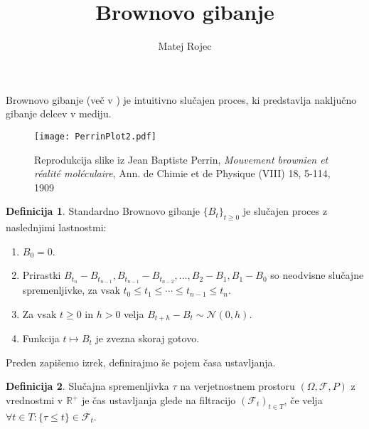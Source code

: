 \documentclass[11pt]{article}
\newcommand{\f}{\mathcal{F}}
\theoremstyle{definition}
\newtheorem{definicija}{Definicija}
\theoremstyle{plain}
\begin{document}
\title{Brownovo gibanje}
\author{Matej Rojec}
\date{}

\maketitle


Brownovo gibanje (več v \cite{karatzas1991brownian}) je intuitivno slučajen proces, %
ki predstavlja naključno gibanje delcev v mediju.
    
\begin{figure}[!ht]
    \texttt{[image: PerrinPlot2.pdf]}
    \centering
    \caption{Reprodukcija slike iz Jean Baptiste Perrin, \emph{Mouvement brownien et réalité moléculaire}, Ann. de Chimie et de Physique (VIII) 18, 5-114, 1909}
\end{figure}

\begin{definicija}
        Standardno Brownovo gibanje $\{B_t\}_{t \geq 0}$ je slučajen proces z naslednjimi lastnostmi: 

\begin{enumerate}
               \item $B_0 = 0$.
               \item Prirastki $B_{t_n} - B_{t_{n-1}}, B_{t_{n-1}} - B_{t_{n-2}}, \ldots, B_2 - B_1, B_1 - B_0$ so neodvisne slučajne spremenljivke, za vsak $t_0 \leq t_1 \leq \cdots \leq t_{n-1} \leq t_n$.
                \item Za vsak $t \geq 0$ in $h > 0$ velja $B_{t+h} - B_t \sim \mathcal{N}(0, h)$.
                \item Funkcija $t \mapsto B_t$ je zvezna skoraj gotovo.
\end{enumerate}
\end{definicija}
    
    Preden zapišemo izrek, definirajmo še pojem časa ustavljanja.
    

\begin{definicija}
        Slučajna spremenljivka $\tau$ na verjetnostnem prostoru $(\Omega,\f,P)$ z vrednostmi v $\mathds{R}^+$
        je čas ustavljanja glede na filtracijo $(\f_t)_{t\in T}$, če velja $\forall t \in T:\{ \tau \leq t \} \in \f_t $.
\end{definicija}
    
\end{document}
